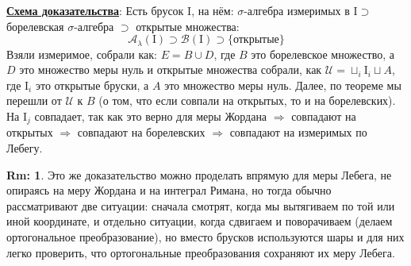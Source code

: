 \documentclass[12pt]{article}
\newcommand{\MI}{\mathrm{I}}
\newcommand{\MU}{\mathcal{U}}
\newcommand{\MA}{\mathcal{A}}
\newcommand{\MB}{\mathcal{B}}
\theoremstyle{definition}
\newtheorem{rem}{Rm:}
\begin{document}
\textbf{\uline{Схема доказательства}}: Есть брусок $\MI$, на нём: $\sigma$-алгебра измеримых в $\MI \supset$ борелевская $\sigma$-алгебра $\supset$ открытые множества:
$$
	\MA_{\lambda}(\MI) \supset \MB(\MI) \supset \{\text{открытые}\}
$$ 
Взяли измеримое, собрали как: $E = B\cup D$, где $B$ это борелевское множество, а $D$ это множество меры нуль и открытые множества собрали, как $\MU = \sqcup_i \MI_i \sqcup A$, где $\MI_i$ это открытые бруски, а $A$ это множество меры нуль. Далее, по теореме мы перешли от $\MU$ к $B$ (о том, что если совпали на открытых, то и на борелевских). На $\MI_j$ совпадает, так как это верно для меры Жордана $\Rightarrow$ совпадают на открытых $\Rightarrow$ совпадают на борелевских $\Rightarrow$ совпадают на измеримых по Лебегу.

\begin{rem}
	Это же доказательство можно проделать впрямую для меры Лебега, не опираясь на меру Жордана и на интеграл Римана, но тогда обычно рассматривают две ситуации: сначала смотрят, когда мы вытягиваем по той или иной координате, и отдельно ситуации, когда сдвигаем и поворачиваем (делаем ортогональное преобразование), но вместо брусков используются шары и для них легко проверить, что ортогональные преобразования сохраняют их меру Лебега.
\end{rem}
\end{document}
